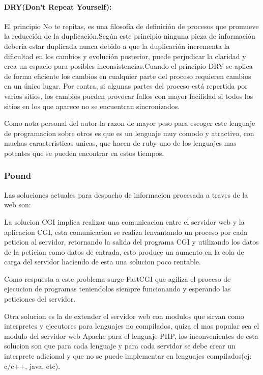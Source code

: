 \paragraph{DRY(Don't Repeat Yourself):}
El principio No te repitas, es una filosofía de definición de procesos que promueve la reducción de la duplicación.\newline Según este principio ninguna pieza de información debería estar duplicada nunca debido a que la duplicación incrementa la dificultad en los cambios y evolución posterior, puede perjudicar la claridad y crea un espacio para posibles inconsistencias.\newline Cuando el principio DRY se aplica de forma eficiente los cambios en cualquier parte del proceso requieren cambios en un único lugar. Por contra, si algunas partes del proceso está repertida por varios sitios, los cambios pueden provocar fallos con mayor facilidad si todos los sitios en los que aparece no se encuentran sincronizados.

Como nota personal del autor la razon de mayor peso para escoger este lenguaje de programacion sobre otros es que es un lenguaje muy comodo y atractivo, con muchas caracteristicas unicas, que hacen de ruby uno de los lenguajes mas potentes que se pueden encontrar en estos tiempos.


\subsubsection*{Pound \cite{pound} }

Las soluciones actuales para despacho de informacion procesada a traves de la web son:

La solucion CGI implica realizar una comunicacion entre el servidor web y la aplicacion CGI, esta comunicacion se realiza lenvantando un proceso por cada peticion al servidor, retornando la salida del programa CGI y utilizando los datos de la peticion como datos de entrada, esto produce un aumento en la cola de carga del servidor haciendo de esta una solucion poco rentable.

Como respuesta a este problema surge FastCGI que agiliza el proceso de ejecucion de programas teniendolos siempre funcionando y esperando las peticiones del servidor.

Otra solucion es la de extender el servidor web con modulos que sirvan como interpretes y ejecutores para lenguajes no compilados, quiza el mas popular sea el modulo del servidor web Apache para el lenguaje PHP, los inconvenientes de esta solucion son que para cada lenguaje y para cada servidor se debe crear un interprete adicional y que no se puede implementar en lenguajes compilados(ej: c/c++, java, etc).

